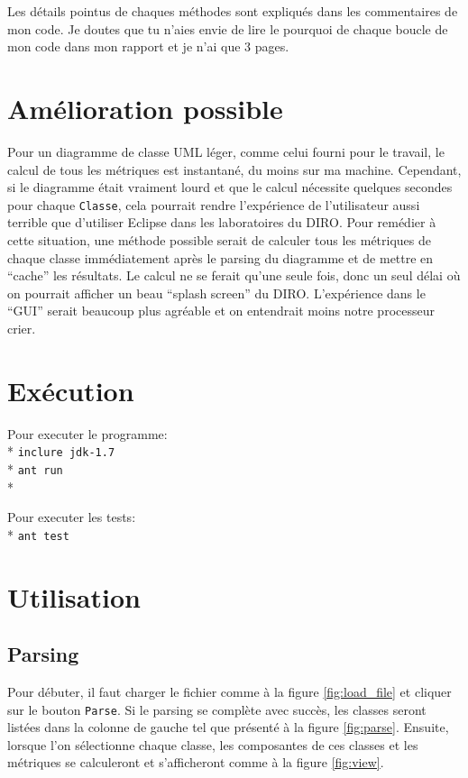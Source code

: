 \documentclass[12pt]{article}
\begin{document}
Les détails pointus de chaques méthodes sont expliqués dans les commentaires de mon code. Je doutes que tu n'aies envie de lire le pourquoi de chaque boucle de mon code dans mon rapport et je n'ai que 3 pages.

\section{Amélioration possible}
Pour un diagramme de classe UML léger, comme celui fourni pour le travail, le calcul de tous les métriques est instantané, du moins sur ma machine. Cependant, si le diagramme était vraiment lourd et que le calcul nécessite quelques secondes pour chaque \texttt{Classe}, cela pourrait rendre l'expérience de l'utilisateur aussi terrible que d'utiliser Eclipse dans les laboratoires du DIRO. Pour remédier à cette situation, une méthode possible serait de calculer tous les métriques de chaque classe immédiatement après le parsing du diagramme et de mettre en ``cache'' les résultats. Le calcul ne se ferait qu'une seule fois, donc un seul délai où on pourrait afficher un beau ``splash screen'' du DIRO. L'expérience dans le ``GUI'' serait beaucoup plus agréable et on entendrait moins notre processeur crier.

\section{Exécution}

Pour executer le programme: \\*
\texttt{inclure jdk-1.7} \\*
\texttt{ant run}\\*

Pour executer les tests: \\*
\texttt{ant test}

\section{Utilisation}

\subsection{Parsing}

Pour débuter, il faut charger le fichier comme à la figure \ref{fig:load_file} et cliquer sur le bouton \texttt{Parse}. Si le parsing se complète avec succès, les classes seront listées dans la colonne de gauche tel que présenté à la figure \ref{fig:parse}. Ensuite, lorsque l'on sélectionne chaque classe, les composantes de ces classes et les métriques se calculeront et s'afficheront comme à la figure \ref{fig:view}. 
\end{document}
